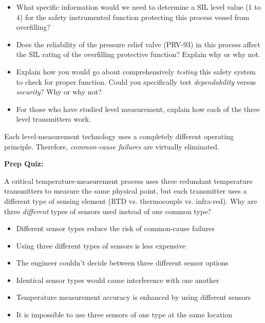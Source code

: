 \begin{itemize}
\item{} What specific information would we need to determine a SIL level value (1 to 4) for the safety instrumented function protecting this process vessel from overfilling?
\item{} Does the reliability of the pressure relief valve (PRV-93) in this process affect the SIL rating of the overfilling protective function?  Explain why or why not.
\item{} Explain how you would go about comprehensively {\it testing} this safety system to check for proper function.  Could you specifically test {\it dependability} versus {\it security}?  Why or why not?
\item{} For those who have studied level measurement, explain how each of the three level transmitters work.
\end{itemize}














Each level-measurement technology uses a completely different operating principle.  Therefore, {\it common-cause failures} are virtually eliminated.

\vfil \eject

\noindent
{\bf Prep Quiz:}

A critical temperature-measurement process uses three redundant temperature transmitters to measure the same physical point, but each transmitter uses a different type of sensing element (RTD vs. thermocouple vs. infra-red).  Why are three {\it different} types of sensors used instead of one common type?

\begin{itemize}
\item{} Different sensor types reduce the risk of common-cause failures
\vskip 5pt 
\item{} Using three different types of sensors is less expensive 
\vskip 5pt 
\item{} The engineer couldn't decide between three different sensor options
\vskip 5pt 
\item{} Identical sensor types would cause interference with one another
\vskip 5pt 
\item{} Temperature measurement accuracy is enhanced by using different sensors
\vskip 5pt 
\item{} It is impossible to use three sensors of one type at the same location
\end{itemize}




